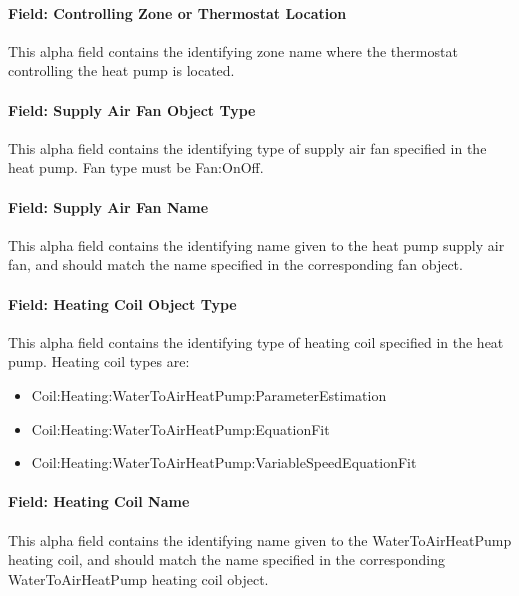 \paragraph{Field: Controlling Zone or Thermostat Location}\label{field-controlling-zone-or-thermostat-location-7}

This alpha field contains the identifying zone name where the thermostat controlling the heat pump is located.

\paragraph{Field: Supply Air Fan Object Type}\label{field-supply-air-fan-object-type-2}

This alpha field contains the identifying type of supply air fan specified in the heat pump. Fan type must be Fan:OnOff.

\paragraph{Field: Supply Air Fan Name}\label{field-supply-air-fan-name-2}

This alpha field contains the identifying name given to the heat pump supply air fan, and should match the name specified in the corresponding fan object.

\paragraph{Field: Heating Coil Object Type}\label{field-heating-coil-object-type-7}

This alpha field contains the identifying type of heating coil specified in the heat pump. Heating coil types are:

\begin{itemize}
\item
  Coil:Heating:WaterToAirHeatPump:ParameterEstimation
\item
  Coil:Heating:WaterToAirHeatPump:EquationFit
\item
  Coil:Heating:WaterToAirHeatPump:VariableSpeedEquationFit
\end{itemize}

\paragraph{Field: Heating Coil Name}\label{field-heating-coil-name-7}

This alpha field contains the identifying name given to the WaterToAirHeatPump heating coil, and should match the name specified in the corresponding WaterToAirHeatPump heating coil object.


